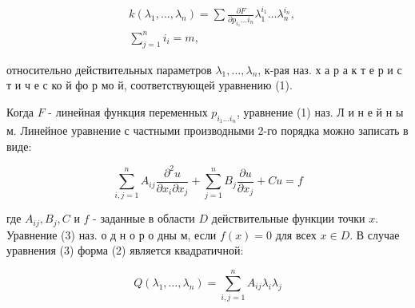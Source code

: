 \documentclass[10pt]{article}
\begin{document}
\[

\begin{aligned}

& k\left(\lambda_{1}, \ldots, \lambda_{n}\right)=\sum \frac{\partial F}{\partial p_{i_{1}} \ldots i_{n}} \lambda_{1}^{i_{1}} \ldots \lambda_{n}^{i_{n}}, \\

& \sum_{j=1}^{n} i_{i}=m,

\end{aligned}

\]



относительно действительных параметров $\lambda_{1}, \ldots, \lambda_{n}$, к-рая наз. х а р а к т е р и с т и ч е с ко й фо р мо й, соответствующей уравнению (1).



Когда $F$ - линейная функция переменных $p_{i_{1} \ldots i_{n}}$, уравнение (1) наз. Л и н е й н ы м. Линейное уравнение с частными производными 2-го порядка можно записать в виде:



\[

\sum_{i, j=1}^{n} A_{i j} \frac{\partial^{2} u}{\partial x_{i} \partial x_{j}}+\sum_{j=1}^{n} B_{j} \frac{\partial u}{\partial x_{j}}+C u=f

\]



где $A_{i j}, B_{j}, C$ и $f$ - заданные в области $D$ действительные функции точки $x$. Уравнение (3) наз. о д н о р о дны м, если $f(x)=0$ для всех $x \in D$. В случае уравнения (3) форма (2) является квадратичной:



\[

Q\left(\lambda_{1}, \ldots, \lambda_{n}\right)=\sum_{i, j=1}^{n} A_{i j} \lambda_{i} \lambda_{j}

\]
\end{document}
